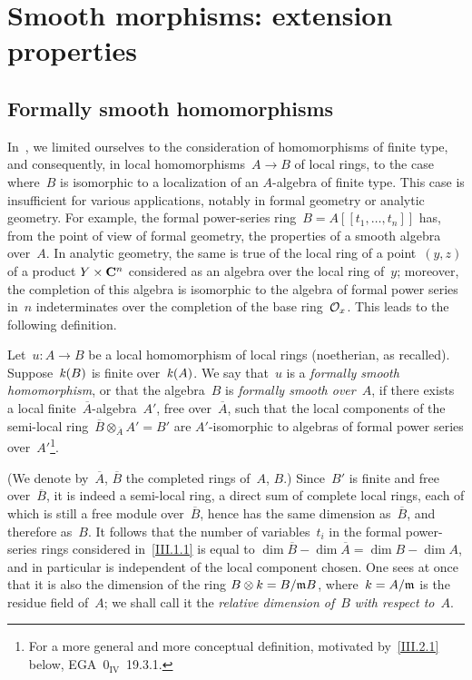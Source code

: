 \chapter{Smooth morphisms: extension properties}
\label{III}

\section{Formally smooth homomorphisms}
\label{III.1}

In~, we limited ourselves to the consideration of homomorphisms of finite type, and consequently, in local homomorphisms~$A\to B$ of local rings, to the case where~$B$ is isomorphic to a localization of an $A$-algebra of finite type. This case is insufficient for various applications, notably in formal geometry or analytic geometry. For example, the formal power-series ring~$B=A[[t_1,\dots,t_n]]$ has, from the point of view of formal geometry, the properties of a smooth algebra over~$A$. In analytic geometry, the same is true of the local ring of a point~$(y,z)$ of a product $Y\times\CC^n$ considered as an algebra over the local ring of~$y$; moreover, the completion of this algebra is isomorphic to the algebra of formal power series in~$n$ indeterminates over the completion of the base ring~$\cal{O}_x$. This leads to the following definition.

\begin{definition}
\label{III.1.1}
Let~$u\colon A\to B$ be a local homomorphism of local rings (noetherian, as recalled). Suppose~$\kres(B)$ is finite over~$\kres(A)$. We say that~$u$ is a \emph{formally smooth homomorphism}, or that the algebra~$B$ is \emph{formally smooth over}~$A$, if there exists a local finite~$\overline{A}$-algebra~$A'$, free over~$\overline{A}$, such that the local components of the semi-local ring~$\overline{B}\otimes_{\overline{A}} A'=B'$ are $A'$-isomorphic to algebras of formal power series over~$A'$\footnote{For a more general and more conceptual definition, motivated by~\ref{III.2.1} below, \cf EGA~$\mathrm{0}_{\mathrm{IV}}$~19.3.1.}.
\end{definition}

(We denote by~$\overline{A}$, $\overline{B}$ the completed rings of~$A$, $B$.) Since~$B'$ is finite and free over~$\overline{B}$, it is indeed a semi-local ring, a direct sum of complete local rings, each of which is still a free module over~$\overline{B}$, hence has the same dimension as~$\overline{B}$, and therefore as~$B$. It follows that the number of variables~$t_i$ in the formal power-series rings considered in~\ref{III.1.1} is equal to $\dim \overline{B}-\dim \overline{A}=\dim B-\dim A$, and in particular is independent of the local component chosen. One sees at once that it is also the dimension of the ring $B\otimes k=B/\goth{m} B$, where~$k=A/\goth{m}$ is the residue field of~$A$; we shall call it the \emph{relative dimension of}~$B$ \emph{with respect to}~$A$.

